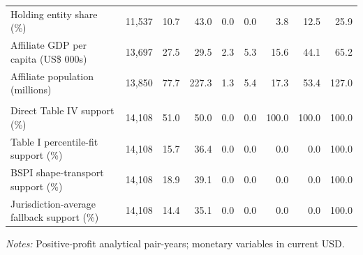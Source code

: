 \begin{longtable}{@{}lrrrrrrrr@{}}
Holding entity share (\%) & 11,537 & 10.7 & 43.0 & 0.0 & 0.0 & 3.8 & 12.5 & 25.9 \\
Affiliate GDP per capita (US\$ 000s) & 13,697 & 27.5 & 29.5 & 2.3 & 5.3 & 15.6 & 44.1 & 65.2 \\
Affiliate population (millions) & 13,850 & 77.7 & 227.3 & 1.3 & 5.4 & 17.3 & 53.4 & 127.0 \\
\addlinespace
\multicolumn{9}{l}{\textit{Panel E: Measurement support}} \\
Direct Table IV support (\%) & 14,108 & 51.0 & 50.0 & 0.0 & 0.0 & 100.0 & 100.0 & 100.0 \\
Table I percentile-fit support (\%) & 14,108 & 15.7 & 36.4 & 0.0 & 0.0 & 0.0 & 0.0 & 100.0 \\
BSPI shape-transport support (\%) & 14,108 & 18.9 & 39.1 & 0.0 & 0.0 & 0.0 & 0.0 & 100.0 \\
Jurisdiction-average fallback support (\%) & 14,108 & 14.4 & 35.1 & 0.0 & 0.0 & 0.0 & 0.0 & 100.0 \\
\end{longtable}
\normalsize

\vspace{0.35em}
\noindent\begin{minipage}{\textwidth}
\footnotesize\raggedright\textit{Notes:} Positive-profit analytical pair-years; monetary variables in current USD.
\end{minipage}
